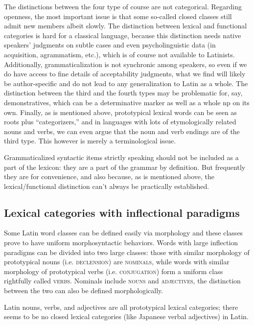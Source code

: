 \documentclass[a4paper, oneside, 12pt]{report}
\newcommand*{\category}[1]{\textsc{#1}}
\begin{document}
The distinctions between the four type of course are not categorical.
Regarding openness, 
the most important issue is that some so-called closed classes still admit new members albeit slowly.
The distinction between lexical and functional categories is hard for a classical language,
because this distinction needs native speakers' judgments on subtle cases 
and even psycholinguistic data (in acquisition, agrammatism, etc.),
which is of course not available to Latinists.
Additionally, grammaticalization is not synchronic among speakers,
so even if we do have access to fine details of acceptability judgments, 
what we find will likely be author-specific and do not lead to any generalization to Latin as a whole.
The distinction between the third and the fourth types 
may be problematic for, say, demonstratives, 
which can be a determinative marker as well as a whole \acs{np} on its own.
Finally, as is mentioned above, prototypical lexical words
can be seen as roots plus ``categorizers,''
and in languages with lots of etymologically related nouns and verbs,
we can even argue that the noun and verb endings are of the third type.
This however is merely a terminological issue.

Grammaticalized syntactic items strictly speaking should not be included as a part of the lexicon:
they are a part of the grammar by definition.
But frequently they are for convenience,
and also because, as is mentioned above,
the lexical/functional distinction can't always be practically established.

\subsection{Lexical categories with inflectional paradigms}

Some Latin word classes can be defined easily via morphology
and these classes prove to have uniform morphosyntactic behaviors.
Words with large inflection paradigms can be divided into two large classes:
those with similar morphology of prototypical nouns (i.e. \category{declension}) are \category{nominals},
while words with similar morphology of prototypical verbs (i.e. \category{conjugation})
form a uniform class rightfully called \category{verbs}.
Nominals include \category{nouns} and \category{adjectives},
the distinction between the two can also be defined morphologically.

Latin nouns, verbs, and adjectives are all prototypical lexical categories;
there seems to be no closed lexical categories (like Japanese verbal adjectives) in Latin.
\end{document}
